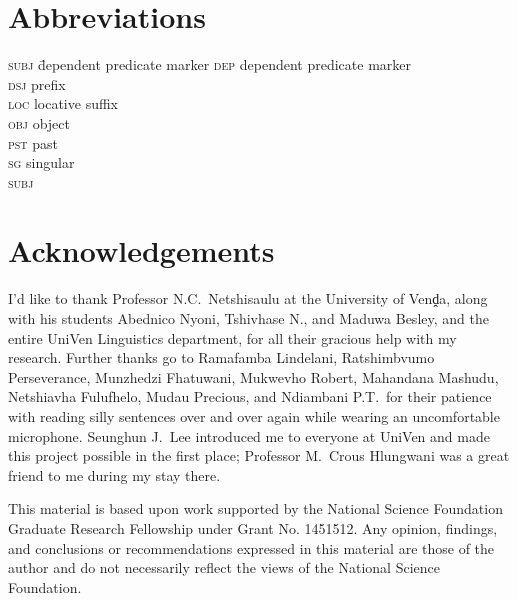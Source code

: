 \documentclass[output=paper 
,modfonts
,nonflat]{langsci/langscibook}
\begin{document}
\section*{Abbreviations}
\begin{multicols}{2}
 \begin{tabbing}
  \textsc{subj}\hspace{1em} \= dependent predicate marker\kill
  \textsc{dep} \> dependent predicate marker\\ \textsc{dsj} \>  prefix\\
\textsc{loc} \> locative suffix\\ \textsc{obj} \> object\\ \textsc{pst} \> past\\
\textsc{sg} \> singular\\ \textsc{subj} \> 
 \end{tabbing}

\end{multicols}



\section*{Acknowledgements}

I'd like to thank Professor N.C.\ Netshisaulu at the University of Venḓa,
along with his students Abednico Nyoni, Tshivhase N., and Maduwa Besley, and
the entire UniVen Linguistics department, for all their gracious help with my
 research. Further thanks go to Ramafamba Lindelani,
Ratshimbvumo Perseverance, Munzhedzi Fhatuwani, Mukwevho Robert, Mahandana
Mashudu, Netshiavha Fulufhelo, Mudau Precious, and Ndiambani P.T.\ for their
patience with reading silly sentences over and over again while wearing an
uncomfortable microphone. Seunghun J.\ Lee introduced me to everyone at UniVen
and made this project possible in the first place; Professor M.\ Crous Hlungwani
was a great friend to me during my stay there.

This material is based upon work supported by the National Science Foundation
Graduate Research Fellowship under Grant No. 1451512. Any opinion, findings,
and conclusions or recommendations expressed in this material are those of the
author and do not necessarily reflect the views of the National Science
Foundation.



{\sloppy
\printbibliography[heading=subbibliography,notkeyword=this]}
\end{document}
